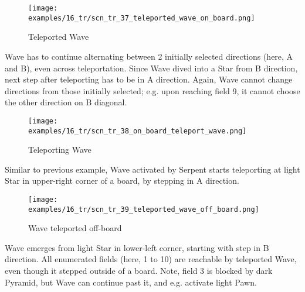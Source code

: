 \clearpage %

\vspace*{-1.0\baselineskip}
\noindent
\begin{figure}[!h]
\texttt{[image: examples/16\_tr/scn\_tr\_37\_teleported\_wave\_on\_board.png]}
\caption{Teleported Wave}
\label{fig:scn_tr_37_teleported_wave_on_board}
\end{figure}

Wave has to continue alternating between 2 initially selected directions (here,
A and B), even across teleportation. Since Wave dived into a Star from B direction,
next step after teleporting has to be in A direction. Again, Wave cannot change
directions from those initially selected; e.g. upon reaching field 9, it cannot
choose the other direction on B diagonal.

\clearpage %

\vspace*{-1.0\baselineskip}
\noindent
\begin{figure}[!h]
\texttt{[image: examples/16\_tr/scn\_tr\_38\_on\_board\_teleport\_wave.png]}
\caption{Teleporting Wave}
\label{fig:scn_tr_38_on_board_teleport_wave}
\end{figure}

Similar to previous example, Wave activated by Serpent starts teleporting at
light Star in upper-right corner of a board, by stepping in A direction.

\clearpage %

\vspace*{-1.0\baselineskip}
\noindent
\begin{figure}[!h]
\texttt{[image: examples/16\_tr/scn\_tr\_39\_teleported\_wave\_off\_board.png]}
\caption{Wave teleported off-board}
\label{fig:scn_tr_39_teleported_wave_off_board}
\end{figure}

Wave emerges from light Star in lower-left corner, starting with step in B
direction. All enumerated fields (here, 1 to 10) are reachable by teleported
Wave, even though it stepped outside of a board. Note, field 3 is blocked by
dark Pyramid, but Wave can continue past it, and e.g. activate light Pawn.

\clearpage %

